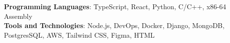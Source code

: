 \begin{itemize}[leftmargin=0in, label={}]
    \small{\item{
     \textbf{Programming Languages}{: TypeScript, React, Python, C/C++,  x86-64 Assembly} \\
     \textbf{Tools and Technologies}{: Node.js, DevOps, Docker, Django, MongoDB,
     PostgresSQL, AWS, Tailwind
     CSS, Figma, HTML} \\
    }}
\end{itemize}